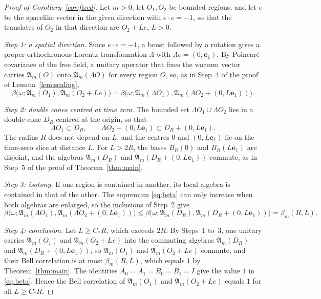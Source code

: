 \documentclass[11pt]{amsart}
\numberwithin{equation}{section}
\theoremstyle{definition}
\newcommand{\A}{\mathfrak A}
\newcommand{\eone}{\mathbf e_1}
\begin{document}
\begin{proof}[Proof of Corollary~\ref{cor:fixed}]
Let \(m>0\), let \(O_1,O_2\) be bounded regions, and let \(e\) be the
spacelike vector in the given direction with \(e\cdot e=-1\), so that
the translates of \(O_2\) in that direction are \(O_2+Le\), \(L>0\).

\smallskip
\emph{Step 1: a spatial direction.} Since \(e\cdot e=-1\), a boost
followed by a rotation gives a proper orthochronous Lorentz
transformation \(\Lambda\) with \(\Lambda e=(0,\eone)\). By Poincar\'e
covariance of the free field, a unitary operator that fixes the vacuum
vector carries \(\A_m(O)\) onto \(\A_m(\Lambda O)\) for every region
\(O\), so, as in Step~4 of the proof of Lemma~\ref{lem:scaling},
\[
 \beta\bigl(\omega;\A_m(O_1),\A_m(O_2+Le)\bigr)
 =\beta\bigl(\omega;\A_m(\Lambda O_1),\A_m(\Lambda O_2+(0,L\eone))\bigr).
\]

\smallskip
\emph{Step 2: double cones centred at time zero.} The bounded set
\(\Lambda O_1\cup\Lambda O_2\) lies in a double cone \(D_R\) centred at
the origin, so that
\[
 \Lambda O_1\subset D_R,\qquad
 \Lambda O_2+(0,L\eone)\subset D_R+(0,L\eone).
\]
The radius \(R\) does not depend on \(L\), and the centres \(0\) and
\((0,L\eone)\) lie on the time-zero slice at distance \(L\). For
\(L>2R\), the bases \(B_R(0)\) and \(B_R(L\eone)\) are disjoint, and
the algebras \(\A_m(D_R)\) and \(\A_m(D_R+(0,L\eone))\) commute, as in
Step~5 of the proof of Theorem~\ref{thm:main}.

\smallskip
\emph{Step 3: isotony.} If one region is contained in another, its
local algebra is contained in that of the other.
The supremum \eqref{eq:beta} can only increase when both algebras are
enlarged, so the inclusions of Step~2 give
\[
 \beta\bigl(\omega;\A_m(\Lambda O_1),\A_m(\Lambda O_2+(0,L\eone))\bigr)
 \le\beta\bigl(\omega;\A_m(D_R),\A_m(D_R+(0,L\eone))\bigr)
 =\beta_m(R,L).
\]

\smallskip
\emph{Step 4: conclusion.} Let \(L\ge C_*R\), which exceeds \(2R\). By
Steps~1 to~3, one unitary carries \(\A_m(O_1)\) and \(\A_m(O_2+Le)\) into
the commuting algebras \(\A_m(D_R)\) and \(\A_m(D_R+(0,L\eone))\), so
\(\A_m(O_1)\) and \(\A_m(O_2+Le)\) commute, and their Bell correlation
is at most \(\beta_m(R,L)\), which equals \(1\) by
Theorem~\ref{thm:main}. The identities \(A_0=A_1=B_0=B_1=I\) give the
value \(1\) in \eqref{eq:beta}. Hence the Bell correlation of \(\A_m(O_1)\)
and \(\A_m(O_2+Le)\) equals \(1\) for all \(L\ge C_*R\).
\end{proof}
\end{document}

